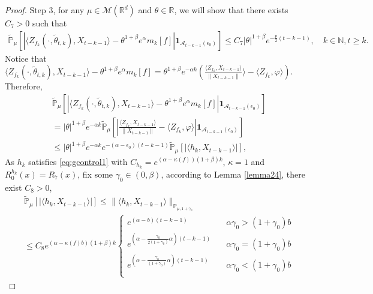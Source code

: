 \documentclass[12pt, a4paper]{amsart}
\theoremstyle{definition}
\numberwithin{equation}{section}
\begin{document}
\begin{proof}
Step 3, for any $\mu \in \mathcal{M}(\mathbb{R}^d)$ and $\theta\in \mathbb{R}$, we will show that there exists $C_7>0$ such that
\begin{align}
\label{eq:31step3}
    \mathbb{\tilde{P}}_{\mu}\left[\left|\langle Z_{f_k}(\cdot,\tilde{\theta}_{t,k}),X_{t-k-1}\rangle-\theta^{1+\beta}e^{\alpha}m_k[f]\right|\mathbf{1}_{\mathcal{A}_{t-k-1}(\epsilon_0)}\right]\leq C_7|\theta|^{1+\beta} e^{-\frac{p}{2}(t-k-1)},\quad k\in \mathbb{N}, t\geq k.
\end{align}
    Notice that $\langle Z_{f_k}(\cdot,\tilde{\theta}_{t,k}),X_{t-k-1}\rangle-\theta^{1+\beta}e^{\alpha}m_k[f]=\theta^{1+\beta}e^{-\alpha k}(\frac{\langle Z_{f_k},X_{t-k-1}\rangle}{\|X_{t-k-1}\|} \rangle-\langle Z_{f_k},\varphi\rangle)$. Therefore,
\begin{align}
        &\mathbb{\tilde{P}}_{\mu}\left[\left|\langle Z_{f_k}(\cdot,\tilde{\theta}_{t,k}),X_{t-k-1}\rangle-\theta^{1+\beta}e^{\alpha}m_k[f]\right|\mathbf{1}_{\mathcal{A}_{t-k-1}(\epsilon_0)}\right]\\
    &=|\theta|^{1+\beta}e^{-\alpha k}\mathbb{\tilde{P}}_{\mu}\left[\left|\frac{\langle Z_{f_k},X_{t-k-1}\rangle}{\|X_{t-k-1}\|}-\langle Z_{f_k},\varphi\rangle\right|\mathbf{1}_{\mathcal{A}_{t-k-1}(\epsilon_0)}\right]\nonumber\\
    &\leq |\theta|^{1+\beta}e^{-\alpha k}e^{-(\alpha-\epsilon_0)(t-k-1)}\mathbb{\tilde{P}}_{\mu}\left[\left|\langle h_k,X_{t-k-1}\rangle\right|\right],\label{II1}
\end{align}
As $h_k$ satisfies \eqref{eq:gcontrol1} with $C_{h_k}=e^{(\alpha-\kappa(f))(1+\beta)k}$, $\kappa=1$ and $R_0^{h_k}(x)=R_7(x)$, fix some $\gamma_0\in(0,\beta)$, according to Lemma \ref{lemma24}, there exist $C_8>0$,
\begin{align}
    &\mathbb{\tilde{P}}_{\mu}\left[\left|\langle h_k,X_{t-k-1}\rangle\right|\right]\leq \|\langle h_k, X_{t-k-1}\rangle\|_{\mathbb{P}_{\mu,1+\gamma_0}}\\
    &\leq C_8 e^{(\alpha-\kappa(f)b)(1+\beta)k}
    \begin{cases}
    e^{(\alpha-b)(t-k-1)}\quad &\alpha\gamma_0>(1+\gamma_0)b\\
    e^{(\alpha-\frac{\gamma_0}{2(1+\gamma_0)}\alpha)(t-k-1)}\quad &\alpha\gamma_0=(1+\gamma_0)b\\
    e^{(\alpha-\frac{\gamma_0}{(1+\gamma_0)}\alpha)(t-k-1)}\quad &\alpha\gamma_0<(1+\gamma_0)b\\

\end{cases}
\end{align}
\end{proof}
\end{document}
